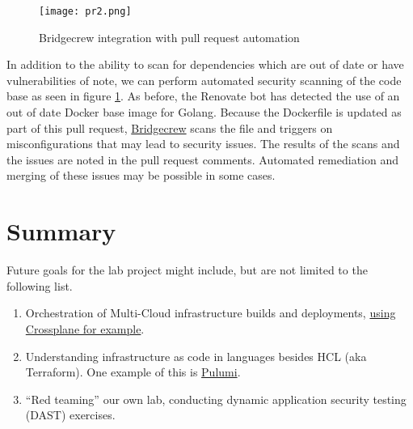 \begin{figure}[H]
	\texttt{[image: pr2.png]}
	\caption{Bridgecrew integration with pull request automation}
	\label{pr2}
\end{figure}


In addition to the ability to scan for dependencies which are out of date or have vulnerabilities of note, we can perform automated security scanning
of the code base as seen in figure \ref{pr2}. As before, the Renovate bot has detected the use of an out of date Docker base image for Golang. Because
the Dockerfile is updated as part of this pull request, \href{https://docs.bridgecrew.io/docs}{Bridgecrew} scans the file and triggers on misconfigurations that may lead to security issues.
The results of the scans and the issues are noted in the pull request comments. Automated remediation and merging of these issues may be possible in
some cases.


\section{\label{sec:Summary}Summary}
\vspace{2mm}
Future goals for the lab project might include, but are not limited to the following list.
\vspace{2mm}
\begin{raggedright}
	\begin{enumerate}
		\item Orchestration of Multi-Cloud infrastructure builds and deployments, \href{https://crossplane.io/docs/v1.3/}{using Crossplane for example}.
		\item Understanding infrastructure as code in languages besides HCL (aka Terraform). One example of this is \href{https://www.pulumi.com/}{Pulumi}.
		\item ``Red teaming'' our own lab, conducting dynamic application security testing (DAST) exercises.
	\end{enumerate}
\end{raggedright}
\vspace{2mm}


\clearpage
\begin{versionhistory}
\end{versionhistory}
\nocite{*}




